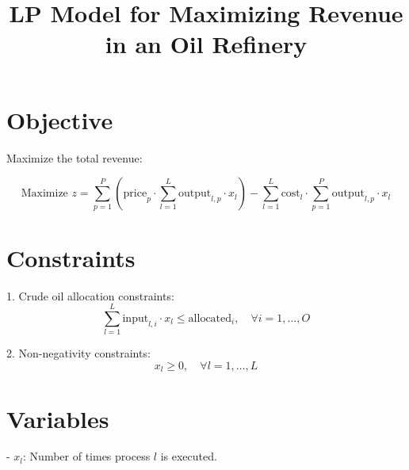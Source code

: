 \documentclass{article}
\begin{document}
\title{LP Model for Maximizing Revenue in an Oil Refinery}
\author{}
\date{}
\maketitle

\section{Objective}
Maximize the total revenue:

\[
\text{Maximize } z = \sum_{p=1}^{P} \left(\text{price}_p \cdot \sum_{l=1}^{L} \text{output}_{l,p} \cdot x_l\right) - \sum_{l=1}^{L} \text{cost}_l \cdot \sum_{p=1}^{P} \text{output}_{l,p} \cdot x_l
\]

\section{Constraints}
1. Crude oil allocation constraints:
\[
\sum_{l=1}^{L} \text{input}_{l,i} \cdot x_l \leq \text{allocated}_i, \quad \forall i = 1, \ldots, O
\]

2. Non-negativity constraints:
\[
x_l \geq 0, \quad \forall l = 1, \ldots, L
\]

\section{Variables}
- \( x_l \): Number of times process \( l \) is executed.
\end{document}
